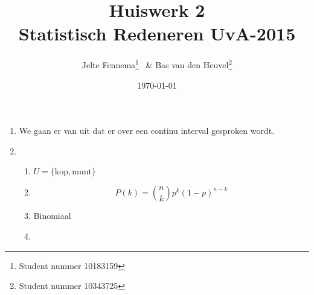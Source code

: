 \documentclass{article}
\title{Huiswerk 2\\ \large{Statistisch Redeneren UvA-2015}}
\author{Jelte Fennema\thanks{Student nummer 10183159} ~\& Bas van den
Heuvel\thanks{Student nummer 10343725}}
\date{\today}
\begin{document}
\maketitle

\begin{enumerate}
    \item We gaan er van uit dat er over een continu interval gesproken wordt.

    \item
        \begin{enumerate}
                \newcommand{\kop}{\text{kop}}
                \newcommand{\munt}{\text{munt}}
            \item
                $U = \{\kop, \munt\}$

            \item
                $$
                P(k)= \left. n\choose k\right. p^k(1-p)^{n-k}
                $$

            \item Binomiaal

            \item

        \end{enumerate}

\end{enumerate}
\end{document}
